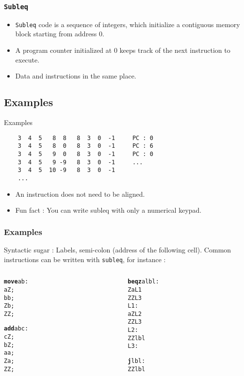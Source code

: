 \documentclass{beamer}
\begin{document}
\begin{frame}
  \frametitle{\texttt{Subleq}}
  \begin{itemize}
    \item \texttt{Subleq} code is a sequence of integers, which initialize
      a contiguous memory block starting from address 0.
    \item A program counter initialized at 0 keeps track of the next
      instruction to execute.
    \item Data and instructions in the same place.
  \end{itemize}
\end{frame}

\subsection{Examples}
\begin{frame}[fragile]{Examples}
  \begin{verbatim}
    3  4  5   8  8   8  3  0  -1     PC : 0
    3  4  5   8  0   8  3  0  -1     PC : 6
    3  4  5   9  0   8  3  0  -1     PC : 0
    3  4  5   9 -9   8  3  0  -1     ...
    3  4  5  10 -9   8  3  0  -1
    ...
  \end{verbatim}
  \begin{itemize}
    \item An instruction does not need to be aligned.
    \item Fun fact : You can write subleq with only a numerical keypad.
  \end{itemize}
\end{frame}

\begin{frame}[fragile]
    \frametitle{Examples}
Syntactic sugar : Labels, semi-colon (address of the following cell).
Common instructions can be written with \texttt{subleq}, for instance :

\begin{columns}[t]
  \begin{column}[T]{3cm}
    \begin{alltt}
{\bf move} a b :
   a Z ;
   b b ;
   Z b ;
   Z Z ;

{\bf add} a b c :
   c Z ;
   b Z ;
   a a ;
   Z a ;
   Z Z ;
    \end{alltt}
  \end{column}
  \begin{column}[T]{3cm}
    \begin{alltt}
{\bf beqz} a lbl :
   	Z a L1
   	Z Z L3
 L1:
    a Z L2
    Z Z L3
 L2:
    Z Z lbl
 L3:

{\bf j} lbl :
    Z Z lbl
    \end{alltt}
  \end{column}
  \end{columns}
\end{frame}
\end{document}
